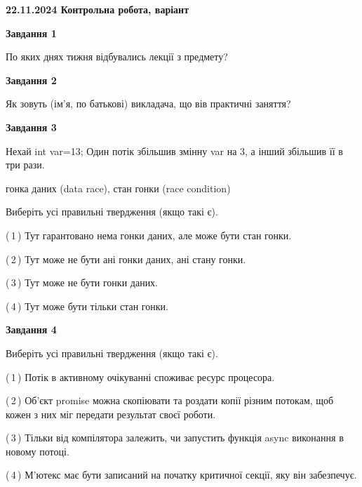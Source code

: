 \documentclass[12pt, ukrainian]{article}
\begin{document}
\begin {large}

\textbf{22.11.2024 Контрольна робота, варіант  }\par


{

\begin{center}
\textbf{Завдання 1}
\end{center}

По яких днях тижня відбувались лекції з предмету?


\begin{center}
\textbf{Завдання 2}
\end{center}

Як зовуть (ім'я, по батькові) викладача, що вів практичні заняття?


\begin{center}
\textbf{Завдання 3}
\end{center}

Нехай int var=13; Один потік збільшив змінну var на 3, а інший збільшив її в три рази.

гонка даних (data race), стан гонки (race condition)

Виберіть усі правильні твердження (якщо такі є).\par
\vspace{2mm}
(\,1\,) Тут гарантовано нема гонки даних, але може бути стан гонки.%

(\,2\,) Тут може не бути ані гонки даних, ані стану гонки.%

(\,3\,) Тут може не бути гонки даних.%

(\,4\,) Тут може бути тільки стан гонки.%


\begin{center}
\textbf{Завдання 4}
\end{center}

Виберіть усі правильні твердження (якщо такі є).\par
\vspace{2mm}

(\,1\,) Потік в активному очікуванні споживає ресурс процесора.%

(\,2\,) Об’єкт promise можна скопіювати та роздати копії різним потокам, щоб кожен з них міг передати результат своєї роботи.%

(\,3\,) Тільки від компілятора залежить, чи запустить функція async виконання в новому потоці.%

(\,4\,) М’ютекс має бути записаний на початку критичної секції, яку він забезпечує.%


}
\end{large}
\end{document}

